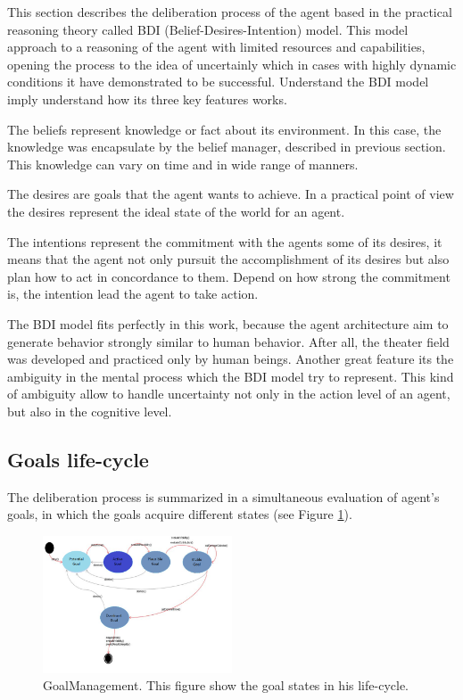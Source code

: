 This section describes the deliberation process of the agent based in the practical reasoning theory called BDI (Belief-Desires-Intention) model. This model approach to a reasoning of the agent with limited resources and capabilities, opening the process to the idea of uncertainly which in cases with highly dynamic conditions it have demonstrated to be successful. Understand the BDI model imply understand how its three key features works\cite{Wooldridge2009}.

The beliefs represent knowledge or fact about its environment. In this case, the knowledge was encapsulate by the belief manager, described in previous section. This knowledge can vary on time and in wide range of manners.

The desires are goals that the agent wants to achieve. In a practical point of view the desires represent the ideal state of the world for an agent.

The intentions represent the commitment with the agents some of its desires, it means that the agent not only pursuit the accomplishment of its desires but also plan how to act in concordance to them. Depend on how strong the commitment is, the intention lead the agent to take action.

The BDI model fits perfectly in this work, because the agent architecture aim to generate behavior strongly similar to human behavior. After all, the theater field was developed and practiced only by human beings. Another great feature its the ambiguity in the mental process which the BDI model try to represent. This kind of ambiguity allow to handle uncertainty not only in the action level of an agent, but also in the cognitive level.

\subsection{Goals life-cycle}

The deliberation process is summarized in a simultaneous evaluation of agent's goals, in which the goals acquire different states (see Figure \ref{fig:GoalManager}).

\begin{figure}
	\centering
	\includegraphics[width=0.5\textwidth]{Images/GoalManagement.png} 
	\caption{GoalManagement. This figure show the goal states in his life-cycle.}
	\label{fig:GoalManager}
\end{figure}

